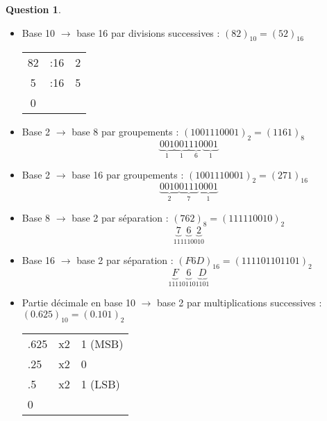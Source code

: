 \documentclass[11pt,a4paper]{article}
\theoremstyle{definition}%
\newtheorem{Q}{Question}[] %
\begin{document}
\begin{Q}
{\begin{itemize}
		\item Base 10 $\rightarrow$ base 16 par divisions successives : $(82)_{10} = (52)_{16}$

			\begin{tabular}{c|c|c}
			82 & :16 & 2 \\
			5  & :16 & 5 \\
			0  &     &   \\
			\end{tabular}

		\item Base 2 $\rightarrow$ base 8 par groupements : $(1001110001)_2 = (1161)_8$
		\[\underbrace{001}_{1}\underbrace{001}_{1}\underbrace{110}_{6}\underbrace{001}_{1}\]

		\item Base 2 $\rightarrow$ base 16 par groupements : $(1001110001)_2 = (271)_{16}$
		\[ \underbrace{0010}_{2}\underbrace{0111}_{7}\underbrace{0001}_{1} \]

		\item Base 8 $\rightarrow$ base 2 par séparation : $(762)_8 = (111110010)_2$
		\[ \underbrace{7}_{111}\underbrace{6}_{110}\underbrace{2}_{010} \]

		\item Base 16 $\rightarrow$ base 2 par séparation : $(F6D)_{16} = (111101101101)_2$
		\[\underbrace{F}_{1111}\underbrace{6}_{0110}\underbrace{D}_{1101} \]

		\item Partie décimale en base 10 $\rightarrow$ base 2 par multiplications successives : $(0.625)_{10} = (0.101)_2$

			\begin{tabular}{l|c|l}
			.625 & x2 & 1 (MSB)\\
			.25  & x2 & 0 \\
			.5   & x2 & 1 (LSB)\\
			0    &    &   \\
			\end{tabular}




	\end{itemize}

}
\end{Q}
\end{document}
